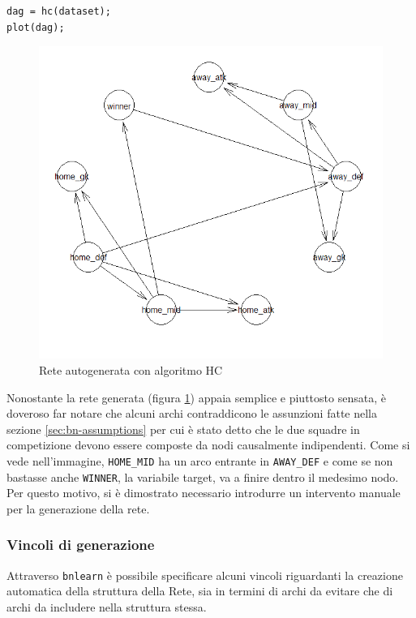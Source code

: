 \documentclass[hidelinks, 12pt]{article}
\begin{document}
\begin{verbatim}
dag = hc(dataset);
plot(dag);
\end{verbatim}

\begin{figure}[H]
	\centering
	\includegraphics[scale=0.75]{images/05_01_hc_pure.png}
	\caption[Rete autogenerata con algoritmo HC]{Rete autogenerata con algoritmo HC}
	\label{img:hc-pure}
\end{figure}

Nonostante la rete generata (figura \ref{img:hc-pure}) appaia semplice e piuttosto sensata, è doveroso far notare che alcuni archi contraddicono le assunzioni fatte nella sezione \ref{sec:bn-assumptions} per cui è stato detto che le due squadre in competizione devono essere composte da nodi causalmente indipendenti. Come si vede nell'immagine, \texttt{HOME\_MID} ha un arco entrante in \texttt{AWAY\_DEF} e come se non bastasse anche \texttt{WINNER}, la variabile target, va a finire dentro il medesimo nodo. Per questo motivo, si è dimostrato necessario introdurre un intervento manuale per la generazione della rete.


\clearpage
\subsubsection{Vincoli di generazione}

Attraverso \texttt{bnlearn} è possibile specificare alcuni vincoli riguardanti la creazione automatica della struttura della Rete, sia in termini di archi da evitare che di archi da includere nella struttura stessa.
\end{document}
